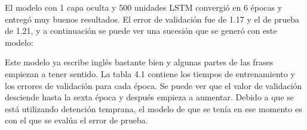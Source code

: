\vspace{1em}

El modelo con 1 capa oculta y 500 unidades LSTM convergió en 6 épocas y entregó muy buenos resultados. El error de validación fue de 1.17 y el de prueba de 1.21, y a continuación se puede ver una sucesión que se generó con este modelo:

\vspace{1em}



\vspace{1em}

Este modelo ya escribe inglés bastante bien y algunas partes de las frases empiezan a tener sentido. La tabla 4.1 contiene los tiempos de entrenamiento y los errores de validación para cada época. Se puede ver que el valor de validación desciende hasta la sexta época y después empieza a aumentar. Debido a que se está utilizando detención temprana, el modelo de que se tenía en ese momento es con el que se evalúa el error de prueba.

\vspace{1em}


